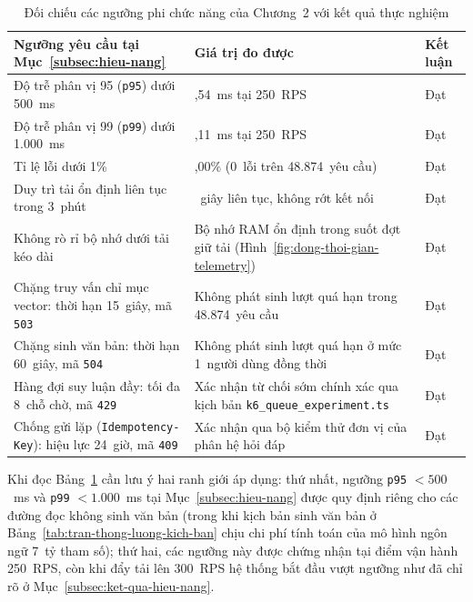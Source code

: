 \begin{table}[htbp]
\centering
\caption{Đối chiếu các ngưỡng phi chức năng của Chương~2 với kết quả thực nghiệm}
\label{tab:doi-chieu-phi-chuc-nang-ch2}
\small
\begin{tabularx}{\textwidth}{
  >{\raggedright\arraybackslash}p{6.2cm}
  >{\raggedright\arraybackslash}X
  >{\raggedright\arraybackslash}p{1.8cm}
}
\toprule
\textbf{Ngưỡng yêu cầu tại Mục~\ref{subsec:hieu-nang}} & \textbf{Giá trị đo được} & \textbf{Kết luận} \\
\midrule
Độ trễ phân vị 95 (\texttt{p95}) dưới 500~ms & 265,54~ms tại 250~RPS & Đạt \\
\midrule
Độ trễ phân vị 99 (\texttt{p99}) dưới 1.000~ms & 475,11~ms tại 250~RPS & Đạt \\
\midrule
Tỉ lệ lỗi dưới 1\% & 0,00\% (0~lỗi trên 48.874~yêu cầu) & Đạt \\
\midrule
Duy trì tải ổn định liên tục trong 3~phút & 180~giây liên tục, không rớt kết nối & Đạt \\
\midrule
Không rò rỉ bộ nhớ dưới tải kéo dài & Bộ nhớ RAM ổn định trong suốt đợt giữ tải (Hình~\ref{fig:dong-thoi-gian-telemetry}) & Đạt \\
\midrule
Chặng truy vấn chỉ mục vector: thời hạn 15~giây, mã \texttt{503} & Không phát sinh lượt quá hạn trong 48.874~yêu cầu & Đạt \\
\midrule
Chặng sinh văn bản: thời hạn 60~giây, mã \texttt{504} & Không phát sinh lượt quá hạn ở mức 1~người dùng đồng thời & Đạt \\
\midrule
Hàng đợi suy luận đầy: tối đa 8~chỗ chờ, mã \texttt{429} & Xác nhận từ chối sớm chính xác qua kịch bản \texttt{k6\_queue\_\allowbreak{}experiment.ts} & Đạt \\
\midrule
Chống gửi lặp (\texttt{Idempotency-Key}): hiệu lực 24~giờ, mã \texttt{409} & Xác nhận qua bộ kiểm thử đơn vị của phân hệ hỏi đáp & Đạt \\
\bottomrule
\end{tabularx}
\end{table}

Khi đọc Bảng~\ref{tab:doi-chieu-phi-chuc-nang-ch2} cần lưu ý hai ranh giới áp dụng: thứ nhất, ngưỡng \texttt{p95} $< 500$~ms và \texttt{p99} $< 1.000$~ms tại Mục~\ref{subsec:hieu-nang} được quy định riêng cho các đường đọc không sinh văn bản (trong khi kịch bản sinh văn bản ở Bảng~\ref{tab:tran-thong-luong-kich-ban} chịu chi phí tính toán của mô hình ngôn ngữ 7~tỷ tham số); thứ hai, các ngưỡng này được chứng nhận tại điểm vận hành 250~RPS, còn khi đẩy tải lên 300~RPS hệ thống bắt đầu vượt ngưỡng như đã chỉ rõ ở Mục~\ref{subsec:ket-qua-hieu-nang}.

